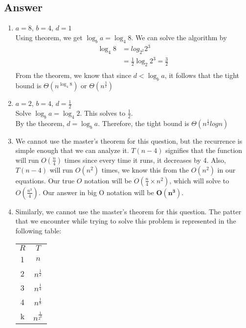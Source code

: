 \documentclass[
	12pt
]{fphw}
\begin{document}
\subsection*{Answer}
\begin{enumerate} %
	\item $a = 8$, $b = 4$, $d = 1$\\
	Using theorem, we get $\log_b a = \log_4 8$. We can solve the
	algorithm by
	\begin{align*}
		\log_4 8 &= log_{2^2} 2^3 \\
		&= \frac{1}{2} \log_2 2^3 = \frac{3}{2}\\
	\end{align*}
	From the theorem, we know that since $d < \log_b a$, it follows that the tight bound is $\Theta(n^{\log_4 8})$ or $\boxed{\Theta(n^{\frac{3}{2}})}$
	\item $a = 2$, $b = 4$, $d = \frac{1}{2}$ \\
	Solve $\log_b a = \log_4 2$. This solves to $\frac{1}{2}$.\\
	By the theorem, $d = \log_b a$. Therefore, the tight bound is $\boxed{\Theta(n^{\frac{1}{2}}logn)}$
	\item We cannot use the master's theorem for this question, but the recurrence is simple enough that we can analyze it. $T(n-4)$ signifies that the function will run $O(\frac{n}{4})$ times since every time it runs, it decreases by 4.
	Also, $T(n-4)$ will run $O(n^2)$ times, we know this from the $O(n^2)$ in our equations. Our true $O$ notation will be $O(\frac{n}{4} \times n^2)$, which will solve to $O(\frac{n^3}{4})$. Our answer in big O notation will be $\boxed{\mathbf{O(n^3)}}$.
	\item Similarly, we cannot use the master's theorem for this question. The patter that we encounter while trying to solve this problem is represented in the following table:
	\begin{center}
		\begin{tabular}{c | c}
			$R$ & $T$ \\
			1 & $n$ \\
			2 & $n^\frac{1}{2}$ \\
			3 & $n^\frac{1}{4}$ \\
			4 & $n^\frac{1}{8}$ \\
			k & $n^\frac{1}{2^k}$ \\
		\end{tabular}
	\end{center}
	

\end{enumerate}
\end{document}
